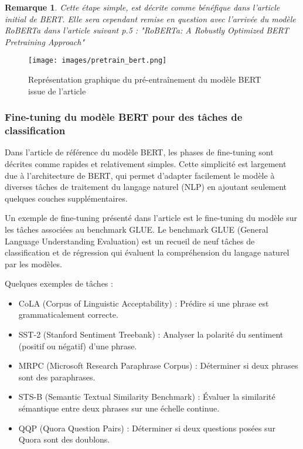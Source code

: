 \documentclass[12pt]{article}
\newtheorem{rmq}{Remarque}
\theoremstyle{definition}
\begin{document}
\begin{rmq}
	Cette étape simple, est décrite comme bénéfique dans l’article initial de BERT. Elle sera cependant remise en question avec l’arrivée du modèle RoBERTa dans l’article suivant p.5 : "RoBERTa: A Robustly Optimized BERT Pretraining Approach" \cite{robert}
\end{rmq}


 \begin{figure*}[!h]
	\centering
	\texttt{[image: images/pretrain\_bert.png]}
	\caption{Représentation graphique du pré-entraînement du modèle BERT issue de l'article \cite{bert_paper}}
\end{figure*}


\newpage
\subsubsection{Fine-tuning du modèle BERT pour des tâches de classification}

Dans l’article de référence du modèle BERT, les phases de fine-tuning sont décrites comme rapides et relativement simples. Cette simplicité est largement due à l'architecture de BERT, qui permet d'adapter facilement le modèle à diverses tâches de traitement du langage naturel (NLP) en ajoutant seulement quelques couches supplémentaires. 

Un exemple de fine-tuning présenté dans l’article est le fine-tuning du modèle sur les tâches associées au benchmark GLUE. Le benchmark GLUE (General Language Understanding Evaluation) est un recueil de neuf tâches de classification et de régression qui évaluent la compréhension du langage naturel par les modèles. 

Quelques exemples de tâches :

\begin{itemize}
	\item CoLA (Corpus of Linguistic Acceptability) : Prédire si une phrase est grammaticalement correcte.
	\item SST-2 (Stanford Sentiment Treebank) : Analyser la polarité du sentiment (positif ou négatif) d'une phrase.
	\item MRPC (Microsoft Research Paraphrase Corpus) : Déterminer si deux phrases sont des paraphrases.
	\item STS-B (Semantic Textual Similarity Benchmark) : Évaluer la similarité sémantique entre deux phrases sur une échelle continue.
	\item QQP (Quora Question Pairs) : Déterminer si deux questions posées sur Quora sont des doublons.
	
\end{itemize}
\end{document}
